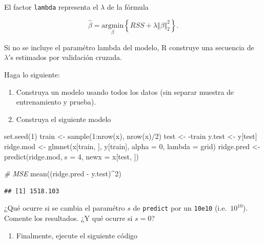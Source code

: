 \documentclass[
  12pt,
]{book}
\newenvironment{Shaded}{\begin{snugshade}}{\end{snugshade}}
\newcommand{\AttributeTok}[1]{\textcolor[rgb]{0.77,0.63,0.00}{#1}}
\newcommand{\CommentTok}[1]{\textcolor[rgb]{0.56,0.35,0.01}{\textit{#1}}}
\newcommand{\DecValTok}[1]{\textcolor[rgb]{0.00,0.00,0.81}{#1}}
\newcommand{\FunctionTok}[1]{\textcolor[rgb]{0.00,0.00,0.00}{#1}}
\newcommand{\NormalTok}[1]{#1}
\newcommand{\OtherTok}[1]{\textcolor[rgb]{0.56,0.35,0.01}{#1}}
\newcommand{\SpecialCharTok}[1]{\textcolor[rgb]{0.00,0.00,0.00}{#1}}
\providecommand{\tightlist}{%
  \setlength{\itemsep}{0pt}\setlength{\parskip}{0pt}}
\begin{document}
El factor \texttt{lambda} representa el \(\lambda\) de la fórmula

\[ \hat{\beta} = \underset{\beta}{\mathrm{argmin}} \left\{RSS + \lambda \Vert \beta \Vert_2^2\right\}.\]

Si no se incluye el paramétro lambda del modelo, R construye una
secuencia de \(\lambda'\)s estimados por validación cruzada.

Haga lo siguiente:

\begin{enumerate}
\def\labelenumi{\arabic{enumi}.}
\item
  Construya un modelo usando todos los datos (sin separar muestra de
  entrenamiento y prueba).
\item
  Construya el siguiente modelo
\end{enumerate}

\begin{Shaded}
\begin{Highlighting}[]
\FunctionTok{set.seed}\NormalTok{(}\DecValTok{1}\NormalTok{)}
\NormalTok{train }\OtherTok{\textless{}{-}} \FunctionTok{sample}\NormalTok{(}\DecValTok{1}\SpecialCharTok{:}\FunctionTok{nrow}\NormalTok{(x), }\FunctionTok{nrow}\NormalTok{(x)}\SpecialCharTok{/}\DecValTok{2}\NormalTok{)}
\NormalTok{test }\OtherTok{\textless{}{-}} \SpecialCharTok{{-}}\NormalTok{train}
\NormalTok{y.test }\OtherTok{\textless{}{-}}\NormalTok{ y[test]}
\NormalTok{ridge.mod }\OtherTok{\textless{}{-}} \FunctionTok{glmnet}\NormalTok{(x[train, ], y[train], }\AttributeTok{alpha =} \DecValTok{0}\NormalTok{,}
    \AttributeTok{lambda =}\NormalTok{ grid)}
\NormalTok{ridge.pred }\OtherTok{\textless{}{-}} \FunctionTok{predict}\NormalTok{(ridge.mod, }\AttributeTok{s =} \DecValTok{4}\NormalTok{, }\AttributeTok{newx =}\NormalTok{ x[test,}
\NormalTok{    ])}

\CommentTok{\# MSE}
\FunctionTok{mean}\NormalTok{((ridge.pred }\SpecialCharTok{{-}}\NormalTok{ y.test)}\SpecialCharTok{\^{}}\DecValTok{2}\NormalTok{)}
\end{Highlighting}
\end{Shaded}

\begin{verbatim}
## [1] 1518.103
\end{verbatim}

¿Qué ocurre si se cambia el paramétro \(s\) de \texttt{predict} por un
\texttt{10e10} (i.e.~\(10^{10}\)). Comente los resultados. ¿Y qué ocurre
si \(s=0\)?

\begin{enumerate}
\def\labelenumi{\arabic{enumi}.}
\setcounter{enumi}{2}
\tightlist
\item
  Finalmente, ejecute el siguiente código
\end{enumerate}
\end{document}
